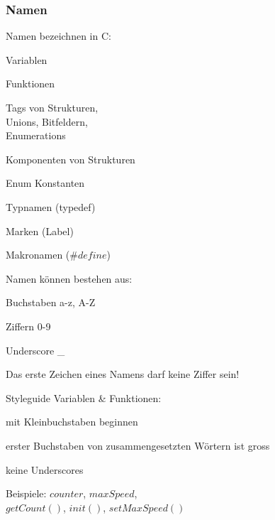  		\subsubsection{Namen}
 			\begin{minipage}[t]{5 cm}
 				Namen bezeichnen in C:
 				\begin{compactitem}
					\item Variablen
					\item Funktionen
					\item Tags von Strukturen, \\Unions, Bitfeldern, \\Enumerations
					\item Komponenten von Strukturen
					\item Enum Konstanten
					\item Typnamen (typedef)
					\item Marken (Label)
					\item Makronamen ($\#define$)
 				\end{compactitem}
 			\end{minipage}
 			\hspace*{1.0cm}
 			\begin{minipage}[t]{5 cm}
	 			Namen können bestehen aus:
	 			\begin{compactitem}
					\item Buchstaben a-z, A-Z
					\item Ziffern 0-9
					\item Underscore \_
	 			\end{compactitem}
	 			\vspace*{0.2cm} 
	 			Das erste Zeichen eines Namens darf keine Ziffer sein!
	 		\end{minipage}
	 		\hspace*{1.0cm}
	 		\begin{minipage}[t]{6 cm}
		 		Styleguide Variablen \& Funktionen:
		 		\begin{compactitem}
		 			\item mit Kleinbuchstaben beginnen	 			
		 			\item erster Buchstaben von zusammengesetzten Wörtern ist gross	
		 			\item keine Underscores
		 		\end{compactitem}
		 		\vspace*{0.2cm} 
		 		Beispiele: $counter$, $maxSpeed$, \\$getCount()$, $init()$, $setMaxSpeed()$	
	 		\end{minipage}	
		
